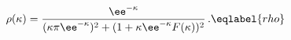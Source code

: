 \begin{equation}
\rho(\kappa) = \frac{\ee^{-\kappa}}
{(\kappa\pi\ee^{-\kappa})^2+(1+\kappa\ee^{-\kappa}F(\kappa))^2} \,.
\eqlabel{rho}
\end{equation}

